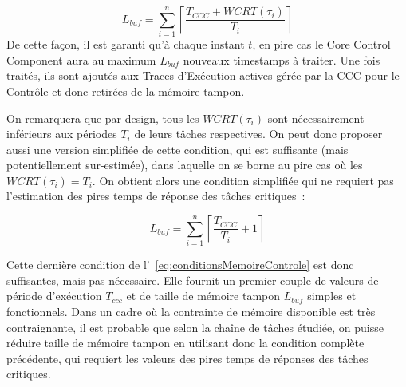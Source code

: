 \documentclass[french, a4paper, 11pt, twoside, pdftex]{StyleThese}
\begin{document}
    		\begin{equation}\label{eq:conditionsMemoireControle}
    			L_{buf} = \sum_{i=1}^{n}\left\lceil \frac{T_{CCC}+WCRT(\tau_i)}{T_i} \right\rceil
    		\end{equation}
    		De cette façon, il est garanti qu'à chaque instant $t$, en pire cas le Core Control Component aura au maximum $L_{buf}$ nouveaux timestamps à traiter. Une fois traités, ils sont ajoutés aux Traces d'Exécution actives gérée par la CCC pour le Contrôle et donc retirées de la mémoire tampon.
    		
    		On remarquera que par design, tous les $WCRT(\tau_i)$ sont nécessairement inférieurs aux périodes $T_i$ de leurs tâches respectives. On peut donc proposer aussi une version simplifiée de cette condition, qui est suffisante (mais potentiellement sur-estimée), dans laquelle on se borne au pire cas où les $ WCRT(\tau_i) = T_i $. On obtient alors une condition simplifiée qui ne requiert pas l'estimation des pires temps de réponse des tâches critiques~: 
    		
    		\begin{equation}\label{eq:conditionsMemoireSimplifiee}
    			L_{buf} = \sum_{i=1}^{n}\left\lceil \frac{T_{CCC}}{T_i} +1 \right\rceil
    		\end{equation}
    		
    		Cette dernière condition de l'~\autoref{eq:conditionsMemoireControle} est donc suffisantes, mais pas nécessaire. Elle fournit un premier couple de valeurs de période d'exécution $T_{ccc}$ et de taille de mémoire tampon $L_{buf}$ simples et fonctionnels. Dans un cadre où la contrainte de mémoire disponible est très contraignante, il est probable que selon la chaîne de tâches étudiée, on puisse réduire taille de mémoire tampon en utilisant donc la condition complète précédente, qui requiert les valeurs des pires temps de réponses des tâches critiques.
    		
    		\pagebreak
    		
\end{document}
